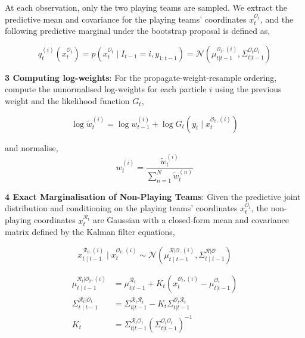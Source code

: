 At each observation, only the two playing teams are sampled. We extract the predictive mean and covariance for the playing teams' coordinates $x_t^{\mathcal{O}_t}$, and the following predictive marginal under the bootstrap proposal is defined as,

\begin{equation*}
    q_t^{(i)}(x_t^{\mathcal{O}_t}) = p(x_t^{\mathcal{O}_t} \mid I_{t-1} = i, y_{1:t-1}) = \mathcal{N}(\mu_{t|t-1}^{\mathcal{O}_t,(i)}, \Sigma_{t|t-1}^{\mathcal{O}_t\mathcal{O}_t})
\end{equation*}

\textbf{3 Computing log-weights}: For the propagate-weight-resample ordering, compute the unnormalised log-weights for each particle $i$ using the previous weight and the likelihood function $G_t$,

\begin{equation*}
    \log \tilde{w}_t^{(i)} = \log w_{t-1}^{(i)} +  \log G_t(y_t \mid x_t^{\mathcal{O}_t, (i)})
\end{equation*}

and normalise,
\begin{equation*}
    w_t^{(i)} = \frac{\tilde{w}_t^{(i)}}{\sum_{n=1}^N \tilde{w}_t^{(n)}}
\end{equation*}

\textbf{4 Exact Marginalisation of Non-Playing Teams}: Given the predictive joint distribution and conditioning on the playing teams' coordinates $x_t^{\mathcal{O}_t}$, the non-playing coordinates $x_t^{\mathcal{R}_t}$ are Gaussian with a closed-form mean and covariance matrix defined by the Kalman filter equations,

\begin{equation*}
    x^{\mathcal{R}_t,(i)}_{t \mid t-1} \mid x^{\mathcal{O}_t,(i)}_{t} \sim \mathcal{N}\left( \mu^{\mathcal{R}|\mathcal{O},(i)}_{t \mid t-1}, \Sigma^{\mathcal{R}|\mathcal{O}}_{t \mid t-1} \right)
\end{equation*}

\begin{align*}
    \mu^{\mathcal{R}_t|\mathcal{O}_t,(i)}_{t \mid t-1} &= \mu_{t|t-1}^{\mathcal{R}_t} + K_t \left( x_t^{\mathcal{O}_t,(i)} - \mu_{t|t-1}^{\mathcal{O}_t} \right) \\
    \Sigma^{\mathcal{R}_t|\mathcal{O}_t}_{t \mid t-1} &= \Sigma_{t|t-1}^{\mathcal{R}_t\mathcal{R}_t} - K_t \Sigma_{t|t-1}^{\mathcal{O}_t\mathcal{R}_t} \\
    K_t &= \Sigma_{t|t-1}^{\mathcal{R}_t\mathcal{O}_t} \left( \Sigma_{t|t-1}^{\mathcal{O}_t\mathcal{O}_t} \right)^{-1}
\end{align*}

